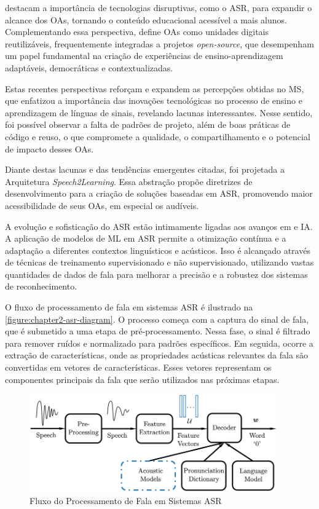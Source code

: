  destacam a importância de tecnologias disruptivas, como o ASR, para expandir o alcance dos OAs, tornando o conteúdo educacional acessível a mais alunos. Complementando essa perspectiva,  define OAs como unidades digitais reutilizáveis, frequentemente integradas a projetos \textit{open-source}, que desempenham um papel fundamental na criação de experiências de ensino-aprendizagem adaptáveis, democráticas e contextualizadas.

Estas recentes perspectivas reforçam e expandem as percepções obtidas no MS, que enfatizou a importância das inovações tecnológicas no processo de ensino e aprendizagem de línguas de sinais, revelando lacunas interessantes. Nesse sentido, foi possível observar a falta de padrões de projeto, além de boas práticas de código e reuso, o que compromete a qualidade, o compartilhamento e o potencial de impacto desses OAs.

Diante destas lacunas e das tendências emergentes citadas, foi projetada a Arquitetura \textit{Speech2Learning}. Essa abstração propõe diretrizes de desenvolvimento para a criação de soluções baseadas em ASR, promovendo maior acessibilidade de seus OAs, em especial os audíveis.

A evolução e sofisticação do ASR estão intimamente ligadas aos avanços em  e IA. A aplicação de modelos de ML em ASR permite a otimização contínua e a adaptação a diferentes contextos linguísticos e acústicos. Isso é alcançado através de técnicas de treinamento supervisionado e não supervisionado, utilizando vastas quantidades de dados de fala para melhorar a precisão e a robustez dos sistemas de reconhecimento.

O fluxo de processamento de fala em sistemas ASR é ilustrado na \autoref{figure:chapter2-asr-diagram}. O processo começa com a captura do sinal de fala, que é submetido a uma etapa de pré-processamento. Nessa fase, o sinal é filtrado para remover ruídos e normalizado para padrões específicos. Em seguida, ocorre a extração de características, onde as propriedades acústicas relevantes da fala são convertidas em vetores de características. Esses vetores representam os componentes principais da fala que serão utilizados nas próximas etapas.

\begin{figure}[htb]
\centering
\caption{Fluxo do Processamento de Fala em Sistemas ASR}
\label{figure:chapter2-asr-diagram}
\includegraphics[width=0.95\textwidth]{images/chapter2-asr-diagram.png}
\end{figure}

